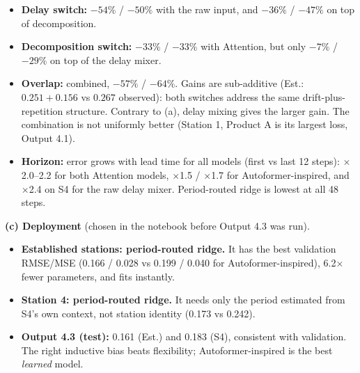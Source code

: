\begin{itemize}
\item \textbf{Delay switch:} $-54\%$ / $-50\%$ with the raw input, and $-36\%$ / $-47\%$ on top of decomposition.
\item \textbf{Decomposition switch:} $-33\%$ / $-33\%$ with Attention, but only $-7\%$ / $-29\%$ on top of the delay mixer.
\item \textbf{Overlap:} combined, $-57\%$ / $-64\%$. Gains are sub-additive (Est.: $0.251+0.156$ vs $0.267$ observed): both switches address the same drift-plus-repetition structure. Contrary to (a), delay mixing gives the larger gain. The combination is not uniformly better (Station 1, Product A is its largest loss, Output 4.1).
\item \textbf{Horizon:} error grows with lead time for all models (first vs last 12 steps): $\times$2.0--2.2 for both Attention models, $\times$1.5 / $\times$1.7 for Autoformer-inspired, and $\times$2.4 on S4 for the raw delay mixer. Period-routed ridge is lowest at all 48 steps.
\end{itemize}

\textbf{(c) Deployment} (chosen in the notebook before Output 4.3 was run).
\begin{itemize}
\item \textbf{Established stations: period-routed ridge.} It has the best validation RMSE/MSE (0.166 / 0.028 vs 0.199 / 0.040 for Autoformer-inspired), 6.2$\times$ fewer parameters, and fits instantly.
\item \textbf{Station 4: period-routed ridge.} It needs only the period estimated from S4's own context, not station identity (0.173 vs 0.242).
\item \textbf{Output 4.3 (test):} 0.161 (Est.) and 0.183 (S4), consistent with validation. The right inductive bias beats flexibility; Autoformer-inspired is the best \emph{learned} model.
\end{itemize}
